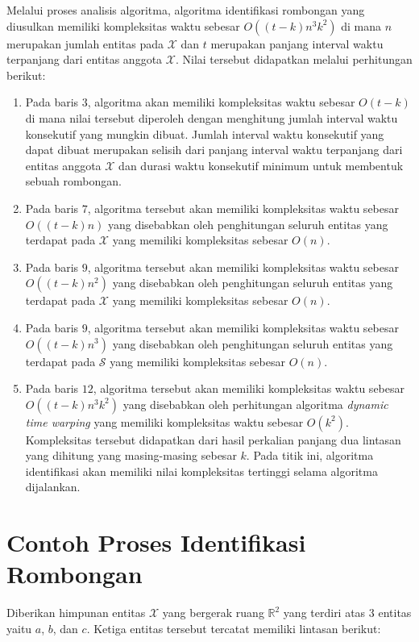 {\color{blue} Melalui proses analisis algoritma, algoritma identifikasi rombongan yang diusulkan memiliki kompleksitas waktu sebesar $O((t - k)n^3k^2)$ di mana $n$ merupakan jumlah entitas pada $\mathcal{X}$ dan $t$ merupakan panjang interval waktu terpanjang dari entitas anggota $\mathcal{X}$. Nilai tersebut didapatkan melalui perhitungan berikut:

\begin{enumerate}
    \item Pada baris $3$, algoritma akan memiliki kompleksitas waktu sebesar $O(t - k)$ di mana nilai tersebut diperoleh dengan menghitung jumlah interval waktu konsekutif yang mungkin dibuat. Jumlah interval waktu konsekutif yang dapat dibuat merupakan selisih dari panjang interval waktu terpanjang dari entitas anggota $\mathcal{X}$ dan durasi waktu konsekutif minimum untuk membentuk sebuah rombongan.
    \item Pada baris $7$, algoritma tersebut akan memiliki kompleksitas waktu sebesar $O((t - k)n)$ yang disebabkan oleh penghitungan seluruh entitas yang terdapat pada $\mathcal{X}$ yang memiliki kompleksitas sebesar $O(n)$.
    \item Pada baris $9$, algoritma tersebut akan memiliki kompleksitas waktu sebesar $O((t - k)n^2)$ yang disebabkan oleh penghitungan seluruh entitas yang terdapat pada $\mathcal{X}$ yang memiliki kompleksitas sebesar $O(n)$.
    \item Pada baris $9$, algoritma tersebut akan memiliki kompleksitas waktu sebesar $O((t - k)n^3)$ yang disebabkan oleh penghitungan seluruh entitas yang terdapat pada $\mathcal{S}$ yang memiliki kompleksitas sebesar $O(n)$.
    \item Pada baris $12$, algoritma tersebut akan memiliki kompleksitas waktu sebesar $O((t - k)n^3k^2)$ yang disebabkan oleh perhitungan algoritma \textit{dynamic time warping} yang memiliki kompleksitas waktu sebesar $O(k^2)$. Kompleksitas tersebut didapatkan dari hasil perkalian panjang dua lintasan yang dihitung yang masing-masing sebesar $k$. Pada titik ini, algoritma identifikasi akan memiliki nilai kompleksitas tertinggi selama algoritma dijalankan.
\end{enumerate}}

\section{Contoh Proses Identifikasi Rombongan}
\label{sec:algorithm-example}

Diberikan himpunan entitas $\mathcal{X}$ yang bergerak ruang $\mathbb{R}^2$ yang terdiri atas 3 entitas yaitu $a$, $b$, dan $c$. Ketiga entitas tersebut tercatat memiliki lintasan berikut:

